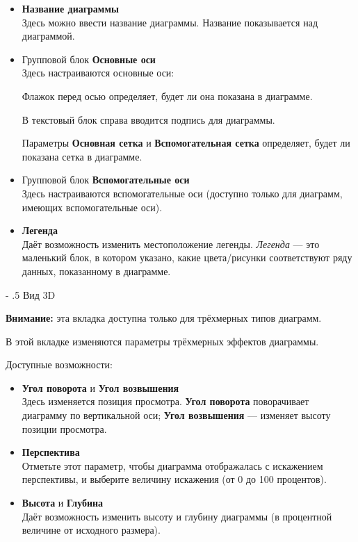 ﻿\documentclass[a4paper,10pt]{article}
\makeatletter
\renewcommand\paragraph{%
   \@startsection{paragraph}{4}{0mm}%
      {-\baselineskip}%
      {.5\baselineskip}%
      {\normalfont\normalsize\bfseries}}
\makeatother
\begin{document}
 \begin{itemize}
  \item \textbf{Название диаграммы}\\
  Здесь можно ввести название диаграммы. Название показывается над диаграммой.
  \item Групповой блок \textbf{Основные оси}\\
  Здесь настраиваются основные оси:
  
  Флажок перед осью определяет, будет ли она показана в диаграмме.
  
  В текстовый блок справа вводится подпись для диаграммы.
  
  Параметры \textbf{Основная сетка} и \textbf{Вспомогательная сетка} определяет, будет ли показана сетка в диаграмме.
  \item Групповой блок \textbf{Вспомогательные оси}\\
  Здесь настраиваются вспомогательные оси (доступно только для диаграмм, имеющих вспомогательные оси).
  \item \textbf{Легенда}\\
Даёт возможность изменить местоположение легенды. \textit{Легенда} — это маленький блок, в котором указано, какие цвета/рисунки соответствуют ряду данных, показанному в диаграмме.  
 \end{itemize}
 
 \paragraph{Вид 3D}
 \begin{mdframed}[backgroundcolor=blue!10]
\textbf{Внимание:} эта вкладка доступна только для трёхмерных типов диаграмм.
\end{mdframed}

В этой вкладке изменяются параметры трёхмерных эффектов диаграммы.

Доступные возможности:

\begin{itemize}
 \item \textbf{Угол поворота} и \textbf{Угол возвышения}\\
 Здесь изменяется позиция просмотра. \textbf{Угол поворота} поворачивает диаграмму по вертикальной оси; \textbf{Угол возвышения} — изменяет высоту позиции просмотра.
 \item \textbf{Перспектива}\\
 Отметьте этот параметр, чтобы диаграмма отображалась с искажением перспективы, и выберите величину искажения (от 0 до 100 процентов).
 \item \textbf{Высота} и \textbf{Глубина}\\
 Даёт возможность изменить высоту и глубину диаграммы (в процентной величине от исходного размера).
\end{itemize}
\end{document}
